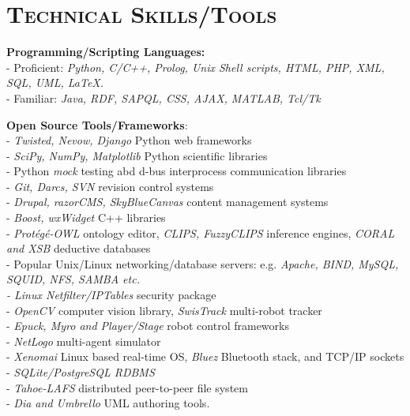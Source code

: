 \documentclass[notopicbreak,contbibnum,plain]{simplecv}
\begin{document}
\section{\textsc{Technical Skills/Tools}}
\vspace*{-0.3cm}
\begin{topic}
\item \textbf{Programming/Scripting Languages:}\\
- Proficient: \textit{Python, C/C++,  Prolog, Unix Shell scripts, HTML, PHP, XML, SQL, UML, LaTeX.}\\
- Familiar: \textit{Java, RDF, SAPQL, CSS, AJAX, MATLAB, Tcl/Tk}
\vspace*{-0.2cm}
\item  \textbf{Open Source Tools/Frameworks}:\\ 
- \textit{Twisted, Nevow, Django} Python web frameworks\\ 
- \textit{SciPy, NumPy, Matplotlib} Python  scientific libraries\\
- Python \textit{mock} testing abd d-bus interprocess communication libraries\\ 
- \textit{Git, Darcs, SVN} revision control systems\\ 
- \textit{Drupal, razorCMS, SkyBlueCanvas} content management systems\\ 
- \textit{Boost, wxWidget} C++ libraries\\ 
- \textit{Prot\'{e}g\'{e}-OWL} ontology editor, \textit{CLIPS, FuzzyCLIPS} inference engines, \textit{CORAL and XSB}  deductive databases\\%
- Popular Unix/Linux networking/database servers: e.g. \textit{Apache, BIND, MySQL, SQUID, NFS, SAMBA etc.\\
- Linux Netfilter/IPTables} security package\\ 
- \textit{OpenCV} computer vision library, \textit{SwisTrack}  multi-robot tracker\\ 
- \textit{Epuck, Myro and Player/Stage} robot control frameworks\\ 
- \textit{NetLogo} multi-agent simulator\\ 
- \textit{Xenomai} Linux based real-time OS, \textit{Bluez} Bluetooth stack, and TCP/IP sockets\\
- \textit{SQLite/PostgreSQL RDBMS}\\ 
- \textit{Tahoe-LAFS} distributed peer-to-peer file system\\ 
- \textit{Dia and Umbrello} UML authoring tools.
%
\vspace*{-0.3cm}
\end{topic}
\vspace*{-0.3cm}
\end{document}
